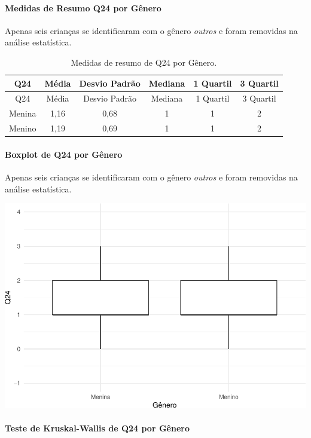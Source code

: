 \documentclass[]{article}
\let\oldparagraph\paragraph
\renewcommand{\paragraph}[1]{\oldparagraph{#1}\mbox{}}
\begin{document}
\hypertarget{medidas-de-resumo-q24-por-guxeanero}{%
\paragraph{Medidas de Resumo Q24 por Gênero}\label{medidas-de-resumo-q24-por-guxeanero}}

Apenas seis crianças se identificaram com o gênero \emph{outros} e foram removidas na análise estatística.

\begin{longtable}[]{@{}cccccc@{}}
\caption{\label{tab:unnamed-chunk-616}Medidas de resumo de Q24 por Gênero.}\tabularnewline
\toprule
Q24 & Média & Desvio Padrão & Mediana & 1 Quartil & 3 Quartil\tabularnewline
\midrule
\endfirsthead
\toprule
Q24 & Média & Desvio Padrão & Mediana & 1 Quartil & 3 Quartil\tabularnewline
\midrule
\endhead
Menina & 1,16 & 0,68 & 1 & 1 & 2\tabularnewline
Menino & 1,19 & 0,69 & 1 & 1 & 2\tabularnewline
\bottomrule
\end{longtable}

\hypertarget{boxplot-de-q24-por-guxeanero}{%
\paragraph{Boxplot de Q24 por Gênero}\label{boxplot-de-q24-por-guxeanero}}

Apenas seis crianças se identificaram com o gênero \emph{outros} e foram removidas na análise estatística.

\begin{center}\includegraphics[width=0.75\linewidth]{relatorio_covid19_files/figure-latex/unnamed-chunk-617-1} \end{center}

\hypertarget{teste-de-kruskal-wallis-de-q24-por-guxeanero}{%
\paragraph{Teste de Kruskal-Wallis de Q24 por Gênero}\label{teste-de-kruskal-wallis-de-q24-por-guxeanero}}
\end{document}
